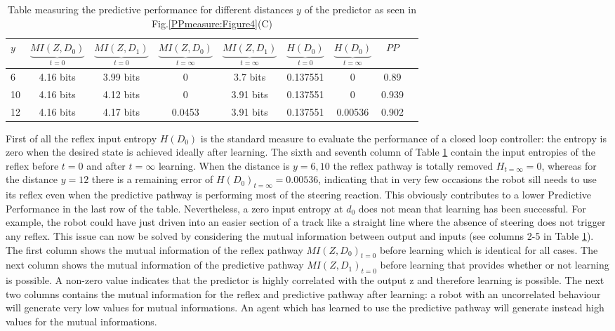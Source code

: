 \begin{table}[htbp]
\addtolength{\tabcolsep}{-2pt}
\caption[Table with entropy values for simple robot]{Table measuring the predictive performance for different distances $y$ of the predictor as seen in Fig.\ref{PPmeasure:Figure4}(C)}
\label{table:PPmeausure:TableSimplePP}
\begin{small}
\begin{center}
  \begin{tabular}{|l|c|c|c|c|c|c|c|c|}
    \hline
    $y$ & $\underbrace{MI(Z,D_0)}_{t=0}$ & $\underbrace{MI(Z,D_1)}_{t=0}$ & $\underbrace{MI(Z,D_0)}_{t=\infty}$& $\underbrace{MI(Z,D_1)}_{t=\infty}$ & $\underbrace{H(D_{0})}_{t=0}$ & $\underbrace{H(D_{0})}_{t=\infty}$ & $PP$ \\ \hline
     6 &4.16 bits&3.99 bits&0& 3.7 bits& 0.137551&0&0.89\\ \hline
     10 &4.16 bits&4.12 bits&0& 3.91 bits& 0.137551&0&0.939\\ \hline
     12 &4.16 bits&4.17 bits&0.0453& 3.91 bits& 0.137551&0.00536&0.902\\ \hline
  \end{tabular}
\end{center}
\end{small}
\end{table}

First of all the reflex input entropy $H(D_{0})$ is the standard measure
to evaluate the performance of a closed loop controller: the entropy is zero when
the desired state is achieved ideally after learning.
The sixth and seventh column of Table \ref{table:PPmeausure:TableSimplePP} contain
the input entropies of the reflex before $t=0$ and after $t=\infty$ learning.
When the distance is $y=6,10$ the reflex pathway is totally removed $H_{t=\infty}=0$,
whereas for the distance $y=12$ there is a remaining error of $H(D_{0})_{t=\infty}=0.00536$,
indicating that in very few occasions the robot sill needs to use its reflex even when
the predictive pathway is performing most of the steering reaction.
This obviously contributes to a lower Predictive Performance in the last row of the table.
Nevertheless, a zero input entropy at $d_0$ does not mean that learning has been
successful. For example, the robot could have just driven into an easier section of a track
like a straight line where the absence of steering does not trigger any reflex.
This issue can now be solved by considering the mutual information between output and inputs
(see columns 2-5 in Table \ref{table:PPmeausure:TableSimplePP}).
The first column shows the mutual information of the reflex pathway $MI(Z,D_0)_{t=0}$
before learning which is identical for all cases.
The next column shows the mutual information of the predictive pathway $MI(Z,D_1)_{t=0}$
before learning that provides whether or not learning is possible.
A non-zero value indicates that the predictor is highly correlated with the output z
and therefore learning is possible.
The next two columns contains the mutual information for the reflex and 
predictive pathway after learning: a robot with an uncorrelated behaviour will generate
very low values for mutual informations.
An agent which has learned to use the predictive pathway will generate instead
high values for the mutual informations.

